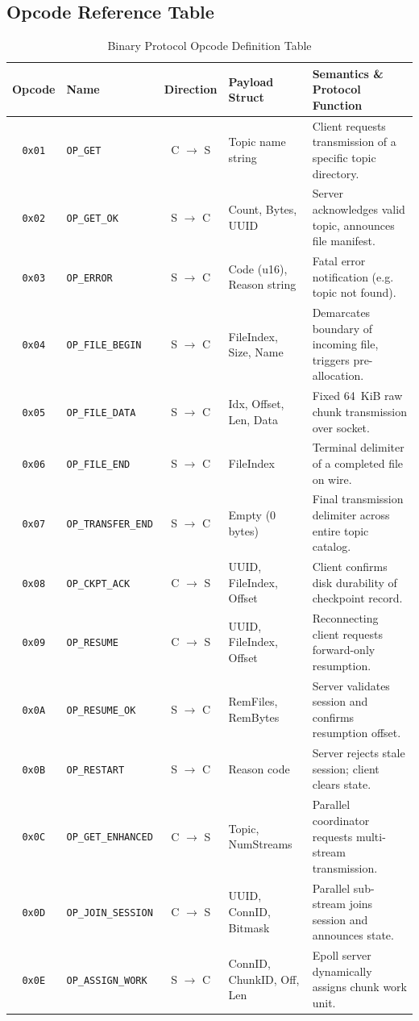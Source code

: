 \documentclass[11pt,a4paper]{article}
\begin{document}
\subsection{Opcode Reference Table}
\begin{table}[H]
    \centering
    \small
    \renewcommand{\arraystretch}{1.2}
    \begin{tabularx}{\textwidth}{c l c l X}
        \toprule
        \textbf{Opcode} & \textbf{Name} & \textbf{Direction} & \textbf{Payload Struct} & \textbf{Semantics \& Protocol Function} \\
        \midrule
        \texttt{0x01} & \texttt{OP\_GET} & C $\to$ S & Topic name string & Client requests transmission of a specific topic directory. \\
        \texttt{0x02} & \texttt{OP\_GET\_OK} & S $\to$ C & Count, Bytes, UUID & Server acknowledges valid topic, announces file manifest. \\
        \texttt{0x03} & \texttt{OP\_ERROR} & S $\to$ C & Code (u16), Reason string & Fatal error notification (e.g. topic not found). \\
        \texttt{0x04} & \texttt{OP\_FILE\_BEGIN} & S $\to$ C & FileIndex, Size, Name & Demarcates boundary of incoming file, triggers pre-allocation. \\
        \texttt{0x05} & \texttt{OP\_FILE\_DATA} & S $\to$ C & Idx, Offset, Len, Data & Fixed 64~KiB raw chunk transmission over socket. \\
        \texttt{0x06} & \texttt{OP\_FILE\_END} & S $\to$ C & FileIndex & Terminal delimiter of a completed file on wire. \\
        \texttt{0x07} & \texttt{OP\_TRANSFER\_END} & S $\to$ C & Empty (0 bytes) & Final transmission delimiter across entire topic catalog. \\
        \texttt{0x08} & \texttt{OP\_CKPT\_ACK} & C $\to$ S & UUID, FileIndex, Offset & Client confirms disk durability of checkpoint record. \\
        \texttt{0x09} & \texttt{OP\_RESUME} & C $\to$ S & UUID, FileIndex, Offset & Reconnecting client requests forward-only resumption. \\
        \texttt{0x0A} & \texttt{OP\_RESUME\_OK} & S $\to$ C & RemFiles, RemBytes & Server validates session and confirms resumption offset. \\
        \texttt{0x0B} & \texttt{OP\_RESTART} & S $\to$ C & Reason code & Server rejects stale session; client clears state. \\
        \texttt{0x0C} & \texttt{OP\_GET\_ENHANCED} & C $\to$ S & Topic, NumStreams & Parallel coordinator requests multi-stream transmission. \\
        \texttt{0x0D} & \texttt{OP\_JOIN\_SESSION} & C $\to$ S & UUID, ConnID, Bitmask & Parallel sub-stream joins session and announces state. \\
        \texttt{0x0E} & \texttt{OP\_ASSIGN\_WORK} & S $\to$ C & ConnID, ChunkID, Off, Len & Epoll server dynamically assigns chunk work unit. \\
        \bottomrule
    \end{tabularx}
    \caption{Binary Protocol Opcode Definition Table}
    \label{tab:opcodes}
\end{table}
\end{document}
